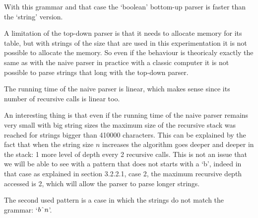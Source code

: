 With this grammar and that case the `boolean' bottom-up parser is faster than the `string' version.

A limitation of the top-down parser is that it needs to allocate memory for its table, but with strings of the size that are used in this experimentation it is not possible to allocate the memory.
So even if the behaviour is theoricaly exactly the same as with the naive parser in practice with a classic computer it is not possible to parse strings that long with the top-down parser.

The running time of the naive parser is linear, which makes sense since its number of recursive calls is linear too.

An interesting thing is that even if the running time of the naive parser remains very small with big string sizes the maximum size of the recursive stack was reached for strings bigger than 410000 characters.
This can be explained by the fact that when the string size $n$ increases the algorithm goes deeper and deeper in the stack: 1 more level of depth every 2 recursive calls.
This is not an issue that we will be able to see with a pattern that does not starts with a `b', indeed in that case as explained in section 3.2.2.1, case 2, the maximum recursive depth accessed is 2, which will allow the parser to parse longer strings.

The second used pattern is a case in which the strings do not match the grammar: `$b\string^ n$'.

